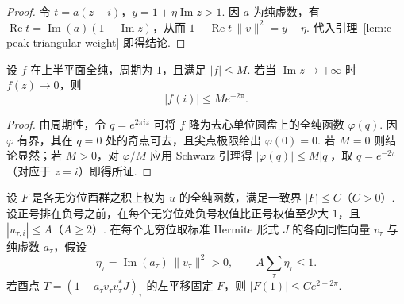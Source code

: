 \begin{proof}
令 $t=a(z-i)$，$y=1+\eta\operatorname{Im}z>1$. 因 $a$ 为纯虚数，有 $\operatorname{Re}t=\operatorname{Im}(a)(1-\operatorname{Im}z)$，从而 $1-\operatorname{Re}t\,\|v\|^2=y-\eta$. 代入引理~\ref{lem:c-peak-triangular-weight} 即得结论.
\end{proof}

\begin{lemma}
\label{lem:c-peak-schwarz}
\emitthmsource
设 $f$ 在上半平面全纯，周期为 $1$，且满足 $|f|\le M$. 若当 $\operatorname{Im}z\to+\infty$ 时 $f(z)\to0$，则
\[
                       |f(i)|\le M e^{-2\pi}.
\]
\end{lemma}

\begin{proof}
由周期性，令 $q=e^{2\pi i z}$ 可将 $f$ 降为去心单位圆盘上的全纯函数 $\varphi(q)$. 因 $\varphi$ 有界，其在 $q=0$ 处的奇点可去，且尖点极限给出 $\varphi(0)=0$. 若 $M=0$ 则结论显然；若 $M>0$，对 $\varphi/M$ 应用 Schwarz 引理得 $|\varphi(q)|\le M|q|$，取 $q=e^{-2\pi}$（对应于 $z=i$）即得所证.
\end{proof}

\begin{lemma}[酉平延不变的全纯函数在单位元处的界]
\label{lem:c-peak-transvection-bound}
\emitthmsource
设 $F$ 是各无穷位酉群之积上权为 $u$ 的全纯函数，满足一致界 $|F|\le C$（$C>0$）. 设正号排在负号之前，在每个无穷位处负号权值比正号权值至少大 $1$，且 $|u_{\tau,i}|\le A$（$A\ge2$）. 在每个无穷位取标准 Hermite 形式 $J$ 的各向同性向量 $v_\tau$ 与纯虚数 $a_\tau$，假设
\[
 \eta_\tau=\operatorname{Im}(a_\tau)\,\|v_\tau\|^2>0,
 \qquad A\sum_\tau\eta_\tau\le1 .
\]
若酉点 $T=(1-a_\tau v_\tau v_\tau^*J)_\tau$ 的左平移固定 $F$，则 $|F(1)|\le C e^{2-2\pi}$.
\end{lemma}

